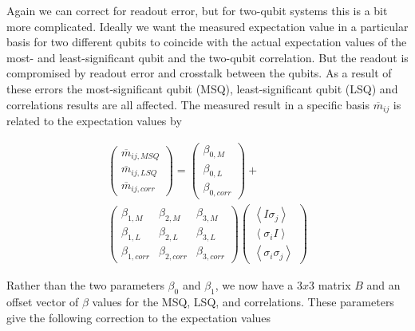 Again we can correct for readout error, but for two-qubit systems this is a bit
more complicated. Ideally we want the measured expectation value in a particular
basis for two different qubits to coincide with the actual expectation values of
the most- and least-significant qubit and the two-qubit correlation. But the
readout is compromised by readout error and crosstalk between the qubits. As a
result of these errors the most-significant qubit (MSQ), least-significant qubit
(LSQ) and correlations results are all affected. The measured result
in a specific basis $\overline{m}_{ij}$ is related to the expectation values by

\begin{equation}
\label{beta}
\begin{split}
\begin{pmatrix} \overline{m}_{ij,MSQ} \\ \overline{m}_{ij,LSQ} \\
\overline{m}_{ij,corr}
\end{pmatrix}=\begin{pmatrix} \beta_{0,M} \\ \beta_{0,L} \\ \beta_{0,corr}
\end{pmatrix}+\\\begin{pmatrix} \beta_{1,M}&\beta_{2,M}&\beta_{3,M} \\
\beta_{1,L}&\beta_{2,L}&\beta_{3,L} \\
\beta_{1,corr}&\beta_{2,corr}&\beta_{3,corr}
\end{pmatrix}\begin{pmatrix} \left\langle I\sigma_j\right\rangle \\ \left\langle
\sigma_iI\right\rangle \\ \left\langle \sigma_i\sigma_j\right\rangle
\end{pmatrix}
\end{split}
\end{equation}

Rather than the two parameters $\beta_0$ and $\beta_1$, we now have a $3x3$
matrix $B$ and an offset vector of $\beta$ values for the MSQ, LSQ, and
correlations. These parameters give the following correction to the expectation values

